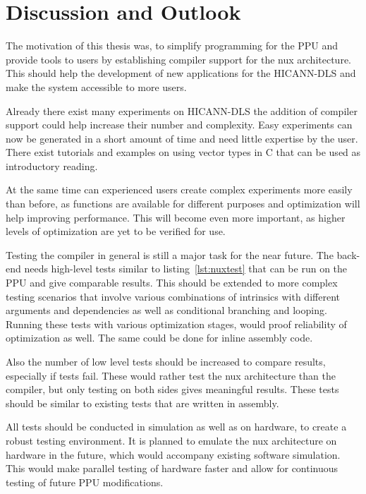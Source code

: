 \chapter{Discussion and Outlook}
\label{chapter:discussion}

The motivation of this thesis was, to simplify programming for the \ac{PPU} and provide tools to users by establishing compiler support for the nux architecture.
This should help the development of new applications for the \ac{HICANN-DLS} and make the system accessible to more users.

Already there exist many experiments on \ac{HICANN-DLS} the addition of compiler support could help increase their number and complexity.
Easy experiments can now be generated in a short amount of time and need little expertise by the user.
There exist tutorials and examples on using vector types in C \cite{altivectutorial} that can be used as introductory reading.

At the same time can experienced users create complex experiments more easily than before, as functions are available for different purposes and optimization will help improving performance.
This will become even more important, as higher levels of optimization are yet to be verified for use.

Testing the compiler in general is still a major task for the near future.
The back-end needs high-level tests similar to listing~\ref{lst:nuxtest} that can be run on the \ac{PPU} and give comparable results.
This should be extended to more complex testing scenarios that involve various combinations of intrinsics with different arguments and dependencies as well as conditional branching and looping.
Running these tests with various optimization stages, would proof reliability of optimization as well.
The same could be done for inline assembly code.

Also the number of low level tests should be increased to compare results, especially if tests fail.
These would rather test the nux architecture than the compiler, but only testing on both sides gives meaningful results.
These tests should be similar to existing tests that are written in assembly.

All tests should be conducted in simulation as well as on hardware, to create a robust testing environment.
It is planned to emulate the nux architecture on hardware in the future, which would accompany existing software simulation.
This would make parallel testing of hardware faster and allow for continuous testing of future \ac{PPU} modifications.


